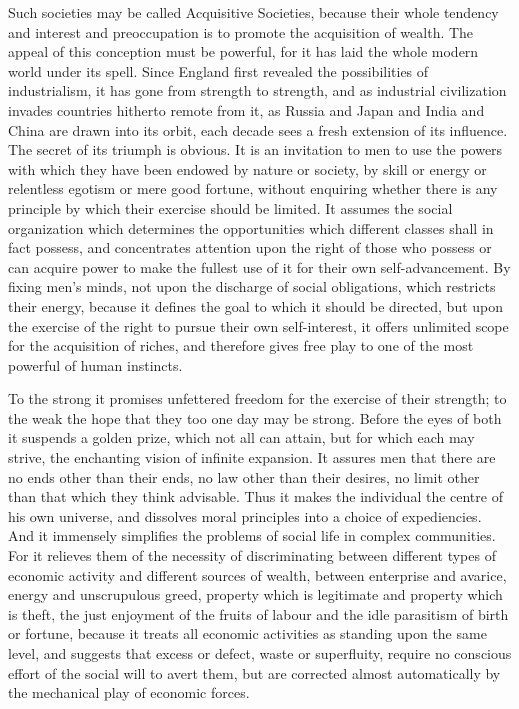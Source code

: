 \documentclass{book}
\begin{document}
Such societies may be called Acquisitive Societies, because their whole tendency and interest and preoccupation is to promote the acquisition of wealth. The appeal of this conception must be powerful, for it has laid the whole modern world under its spell. Since England first revealed the possibilities of industrialism, it has gone from strength to strength, and as industrial civilization invades countries hitherto remote from it, as Russia and Japan and India and China are drawn into its orbit, each decade sees a fresh extension of its influence. The secret of its triumph is obvious. It is an invitation to men to use the powers with which they have been endowed by nature or society, by skill or energy or relentless egotism or mere good fortune, without enquiring whether there is any principle by which their exercise should be limited. It assumes the social organization which determines the opportunities which different classes shall in fact possess, and concentrates attention upon the right of those who possess or can acquire power to make the fullest use of it for their own self-advancement. By fixing men’s minds, not upon the discharge of social obligations, which restricts their energy, because it defines the goal to which it should be directed, but upon the exercise of the right to pursue their own self-interest, it offers unlimited scope for the acquisition of riches, and therefore gives free play to one of the most powerful of human instincts.

To the strong it promises unfettered freedom for the exercise of their strength; to the weak the hope that they too one day may be strong. Before the eyes of both it suspends a golden prize, which not all can attain, but for which each may strive, the enchanting vision of infinite expansion. It assures men that there are no ends other than their ends, no law other than their desires, no limit other than that which they think advisable. Thus it makes the individual the centre of his own universe, and dissolves moral principles into a choice of expediencies. And it immensely simplifies the problems of social life in complex communities. For it relieves them of the necessity of discriminating between different types of economic activity and different sources of wealth, between enterprise and avarice, energy and unscrupulous greed, property which is legitimate and property which is theft, the just enjoyment of the fruits of labour and the idle parasitism of birth or fortune, because it treats all economic activities as standing upon the same level, and suggests that excess or defect, waste or superfluity, require no conscious effort of the social will to avert them, but are corrected almost automatically by the mechanical play of economic forces.
\end{document}
